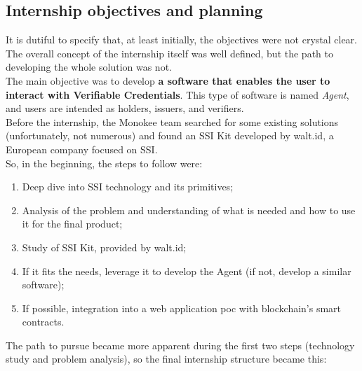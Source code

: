 \subsection{Internship objectives and planning}
It is dutiful to specify that, at least initially, the objectives were not crystal 
clear. The overall concept of the internship itself was well defined, but the path 
to developing the whole solution was not.\\
The main objective was to develop \textbf{a software that enables the user to interact 
with Verifiable Credentials}. This type of software is named \textit{Agent}, and 
users are intended as holders, issuers, and verifiers.\\
Before the internship, the Monokee team searched for some existing solutions 
(unfortunately, not numerous) and found an SSI Kit developed by walt.id, a European 
company focused on SSI.
\vspace*{0.3cm}\\
So, in the beginning, the steps to follow were:
\begin{enumerate}
    \item Deep dive into SSI technology and its primitives;
    \item Analysis of the problem and understanding of what is needed and how to use it
    for the final product;
    \item Study of SSI Kit, provided by walt.id;
    \item If it fits the needs, leverage it to develop the Agent (if not, develop
    a similar software);
    \item If possible, integration into a web application \acrfull{poc} with
    blockchain's smart contracts.
\end{enumerate}
\vspace*{0.3cm}
The path to pursue became more apparent during the first two steps (technology study 
and problem analysis), so the final internship structure became this:
